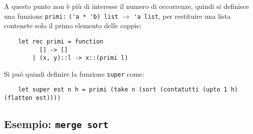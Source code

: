 \documentclass{article}
\numberwithin{equation}{subsection}
\begin{document}
A questo punto non è più di interesse il numero di occorrenze, quindi si definisce una funzione \verb|primi:| \verb|('a * 'b) list| $\rightarrow$ \verb|'a list|, per restituire una lista contenete solo il primo elemento delle coppie:
\begin{verbatim}
    let rec primi = function
          [] -> []
        | (x, y)::l -> x::(primi l)
\end{verbatim}

Si può quindi definire la funzione \verb|super| come:
\begin{verbatim}
    let super est n h = primi (take n (sort (contatutti (upto 1 h) (flatten est))))    
\end{verbatim}

\subsection{Esempio: \texttt{merge sort}}
\end{document}
